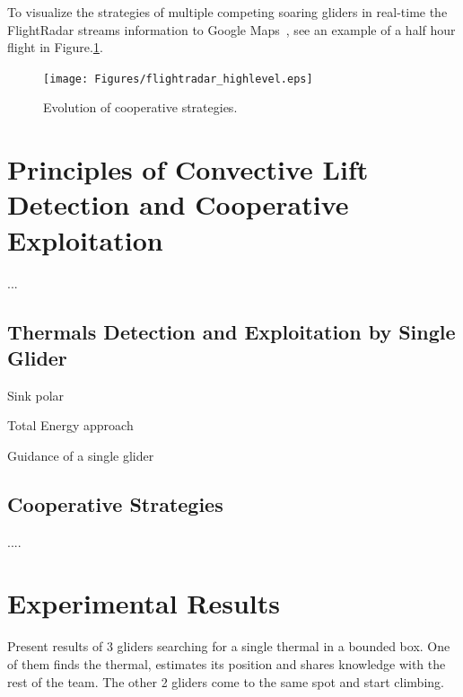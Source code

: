 \documentclass[letterpaper, 10 pt, conference]{ieeeconf}  %
\begin{document}
To visualize the strategies of multiple competing soaring gliders in
real-time the FlightRadar streams information to Google
Maps~\cite{GoogleMaps:2013:Online}, see an example of a half hour flight in
Figure.\ref{fig:FlightRadar}.
\begin{figure}[thpb]
  \centering
  \texttt{[image: Figures/flightradar\_highlevel.eps]}
  \caption{Evolution of cooperative strategies.}
  \label{fig:FlightRadar}
\end{figure}

\section{Principles of Convective Lift Detection and Cooperative Exploitation}
...

\subsection{ Thermals Detection and Exploitation by Single Glider}

Sink polar

Total Energy approach

Guidance of a single glider

\subsection{ Cooperative Strategies}

....

\section{Experimental Results}

Present results of 3 gliders searching for a single thermal in a bounded box.
One of them finds the thermal, estimates its position and shares knowledge
with the rest of the team. The other 2 gliders come to the same spot and
start climbing.
\end{document}
